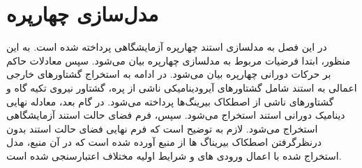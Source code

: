 \chapter{مدل‌سازی چهارپره}
 در این فصل به مدلسازی استند چهارپره آزمایشگاهی  پرداخته شده است. به این منظور، ابتدا فرضیات مربوط به 
 مدلسازی چهارپره بیان می‌شود. سپس معادلات حاکم بر حرکات 
 دورانی چهارپره بیان می‌شود. در ادامه به استخراج گشتاورهای خارجی اعمالی 
 به استند شامل گشتاورهای آیرودینامیکی ناشی از پره، گشتاور نیروی تکیه گاه و گشتاورهای ناشی از 
 اصطکاک بیرینگ‌ها پرداخته می‌شود. در گام بعد، معادله نهایی دینامیک دورانی استند 
 استخراج می‌شود. سپس، فرم فضای حالت استند آزمایشگاهی استخراج می‌شود. لازم به 
 توضیح است که فرم نهایی فضای حالت استند بدون درنظرگرفتن اصطکاک بیریناگ ها از منبع
 \cite{Abeshtan}
 آورده ‌شده ‌است که در آن منبع، مدل استخراج شده با اعمال ورودی های و شرایط اولیه مختلاف 
 اعتبارسنجی شده ‌است.
